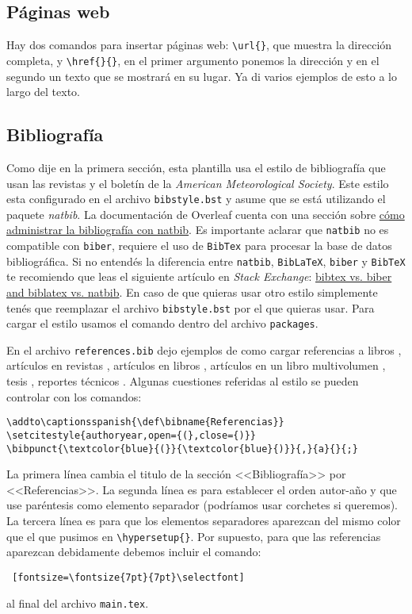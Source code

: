 \documentclass[a4paper,10pt,twocolumn,twoside]{article}
\begin{document}
\subsection{Páginas web}
Hay dos comandos para insertar páginas web: \verb+\url{}+, que muestra la dirección completa, y \verb+\href{}{}+, en el primer argumento ponemos la dirección y en el segundo un texto que se mostrará en su lugar. Ya di varios ejemplos de esto a lo largo del texto.

\subsection{Bibliografía}

Como dije en la primera sección, esta plantilla usa el estilo de bibliografía que usan las revistas y el boletín de la \emph{American Meteorological Society}. Este estilo esta configurado en el archivo \texttt{bibstyle.bst} y asume que se está utilizando el paquete \emph{natbib}. La documentación de Overleaf cuenta con una sección sobre \href{https://www.overleaf.com/learn/latex/bibliography_management_with_natbib}{cómo administrar la bibliografía con natbib}. Es importante aclarar que \texttt{natbib} no es compatible con \texttt{biber}, requiere el uso de \texttt{BibTex} para procesar la base de datos bibliográfica. Si no entendés la diferencia entre \texttt{natbib}, \texttt{BibLaTeX}, \texttt{biber} y \texttt{BibTeX} te recomiendo que leas el siguiente artículo en \emph{Stack Exchange}: \href{https://tex.stackexchange.com/questions/25701/bibtex-vs-biber-and-biblatex-vs-natbib}{bibtex vs. biber and biblatex vs. natbib}. En caso de que quieras usar otro estilo simplemente tenés que reemplazar el archivo \texttt{bibstyle.bst} por el que quieras usar. Para cargar el estilo usamos el comando \verb++ dentro del archivo \texttt{packages}.

En el archivo \texttt{references.bib} dejo ejemplos de como cargar referencias a libros \citep{ANDREWS1987,HOLTON2004}, artículos en revistas \citep{BALDWINetal2020-11}, artículos en libros \citep{PLUMB2010}, artículos en un libro multivolumen \citep{ONEILLetal2015}, tesis \citep{CLARK2017-11}, reportes técnicos \citep{LIMetal2020-1}. Algunas cuestiones referidas al estilo se pueden controlar con los comandos:
\begin{Verbatim}[fontsize=\fontsize{7pt}{7pt}\selectfont]
\addto\captionsspanish{\def\bibname{Referencias}}
\setcitestyle{authoryear,open={(},close={)}}
\bibpunct{\textcolor{blue}{(}}{\textcolor{blue}{)}}{,}{a}{}{;}
\end{Verbatim}
La primera línea cambia el titulo de la sección <<Bibliografía>> por <<Referencias>>. La segunda línea es para establecer el orden autor-año y que use paréntesis como elemento separador (podríamos usar corchetes si queremos). La tercera línea es para que los elementos separadores aparezcan del mismo color que el que pusimos en \verb+\hypersetup{}+. Por supuesto, para que las referencias aparezcan debidamente debemos incluir el comando:
\begin{Verbatim} [fontsize=\fontsize{7pt}{7pt}\selectfont]

\end{Verbatim}
al final del archivo \texttt{main.tex}.
\end{document}
